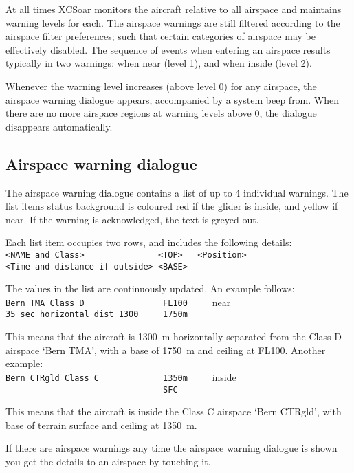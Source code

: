 At all times XCSoar monitors the aircraft relative to all airspace and
maintains warning levels for each.  The airspace warnings are still
filtered according to the airspace filter preferences; such that
certain categories of airspace may be effectively disabled.
The sequence of events when entering an airspace results typically
in two warnings: when near (level 1), and when inside (level 2).

Whenever the warning level increases (above level 0) for any airspace,
the airspace warning dialogue appears, accompanied by a system beep
from.  When there are no more airspace regions at warning levels above
0, the dialogue disappears automatically.


\subsection*{Airspace warning dialogue}

The airspace warning dialogue contains a list of up to 4 individual
warnings.  The list items status background is coloured red if the glider is
inside, and yellow if near.  If the warning is acknowledged, the
text is greyed out.

Each list item occupies two rows, and includes the following details:\\
\verb+<NAME and Class>               <TOP>   <Position>+\\
\verb+<Time and distance if outside> <BASE>+

The values in the list are continuously updated. 
An example follows:\\
\verb+Bern TMA Class D                FL100     +\colorbox{AirspaceYellow}{near}\\
\verb+35 sec horizontal dist 1300     1750m+

This means that the aircraft is 1300~m horizontally separated from the Class D airspace
`Bern TMA', with a base of 1750~m and ceiling at FL100.
Another example:\\
\verb+Bern CTRgld Class C             1350m     +\colorbox{AirspaceRed}{inside}\\
\verb+                                SFC+

This means that the aircraft is inside the Class C airspace `Bern
CTRgld', with base of terrain surface and ceiling at 1350~m.

If there are airspace warnings any time the airspace warning dialogue is shown 
you get the details to an airspace by touching it.



